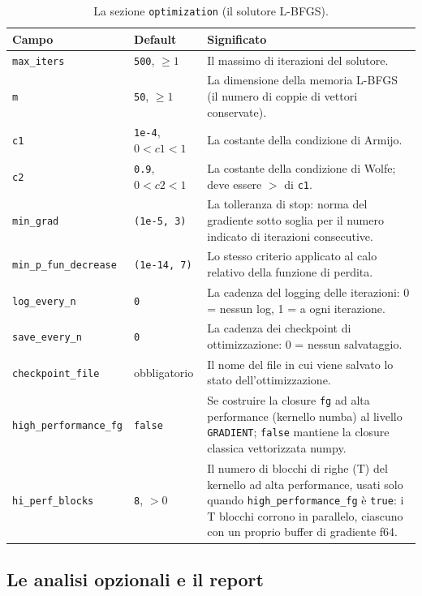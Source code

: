 \begin{table}[htbp]
\centering
\small
\begin{tabularx}{\textwidth}{@{}llX@{}}
\toprule
Campo & Default & Significato \\
\midrule
\texttt{max\_iters} & \texttt{500}, $\ge 1$ & Il massimo di iterazioni del solutore. \\
\texttt{m}         & \texttt{50}, $\ge 1$ & La dimensione della memoria L-BFGS (il numero di coppie di vettori conservate). \\
\texttt{c1}        & \texttt{1e-4}, $0<c1<1$ & La costante della condizione di Armijo. \\
\texttt{c2}        & \texttt{0.9}, $0<c2<1$ & La costante della condizione di Wolfe; deve essere $>$ di \texttt{c1}. \\
\texttt{min\_grad} & \texttt{(1e-5, 3)} & La tolleranza di stop: norma del gradiente sotto soglia per il numero indicato di iterazioni consecutive. \\
\texttt{min\_p\_fun\_decrease} & \texttt{(1e-14, 7)} & Lo stesso criterio applicato al calo relativo della funzione di perdita. \\
\texttt{log\_every\_n} & \texttt{0} & La cadenza del logging delle iterazioni: 0 = nessun log, 1 = a ogni iterazione. \\
\texttt{save\_every\_n} & \texttt{0} & La cadenza dei checkpoint di ottimizzazione: 0 = nessun salvataggio. \\
\texttt{checkpoint\_file} & obbligatorio & Il nome del file in cui viene salvato lo stato dell'ottimizzazione. \\
\texttt{high\_performance\_fg} & \texttt{false} & Se costruire la closure \texttt{fg} ad alta performance (kernello numba) al livello \texttt{GRADIENT}; \texttt{false} mantiene la closure classica vettorizzata numpy. \\
\texttt{hi\_perf\_blocks} & \texttt{8}, $>0$ & Il numero di blocchi di righe (T) del kernello ad alta performance, usati solo quando \texttt{high\_performance\_fg} è \texttt{true}: i T blocchi corrono in parallelo, ciascuno con un proprio buffer di gradiente f64. \\
\bottomrule
\end{tabularx}
\caption{La sezione \texttt{optimization} (il solutore L-BFGS).}
\label{tab:setup-optimization}
\end{table}

\subsection{Le analisi opzionali e il report}

